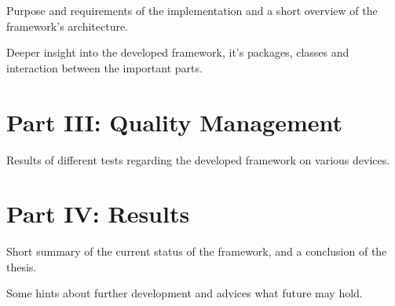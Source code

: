  \vspace{1mm}

\noindent  Purpose and requirements of the implementation and a short overview of the framework's architecture. \\

  \vspace{1mm}

\noindent  Deeper insight into the developed framework, it's packages, classes and interaction between the important parts. \\

\section*{Part III: Quality Management}

  \vspace{1mm}

\noindent  Results of different tests regarding the developed framework on various devices. \\

\newpage

\section*{Part IV: Results}

  \vspace{1mm}

\noindent  Short summary of the current status of the framework, and a conclusion of the thesis. \\

  \vspace{1mm}

\noindent  Some hints about further development and advices what future may hold. \\
